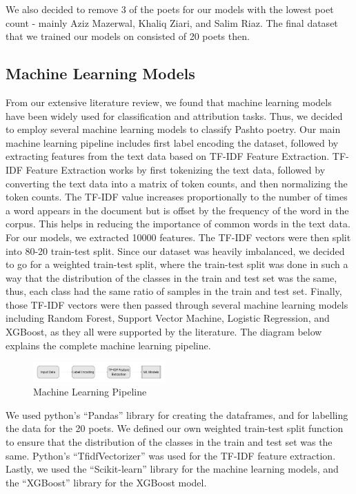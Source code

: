 We also decided to remove 3 of the poets for our models with the lowest poet count - mainly Aziz Mazerwal, Khaliq Ziari, and Salim Riaz. The final dataset that we trained our models on consisted of 20 poets then. 

\subsection{Machine Learning Models}
From our extensive literature review, we found that machine learning models have been widely used for classification and attribution tasks. Thus, we decided to employ several machine learning models to classify Pashto poetry. Our main machine learning pipeline includes first label encoding the dataset, followed by extracting features from the text data based on TF-IDF Feature Extraction. TF-IDF Feature Extraction works by first tokenizing the text data, followed by converting the text data into a matrix of token counts, and then normalizing the token counts. The TF-IDF value increases proportionally to the number of times a word appears in the document but is offset by the frequency of the word in the corpus. This helps in reducing the importance of common words in the text data. For our models, we extracted 10000 features. The TF-IDF vectors were then split into 80-20 train-test split. Since our dataset was heavily imbalanced, we decided to go for a weighted train-test split, where the train-test split was done in such a way that the distribution of the classes in the train and test set was the same, thus, each class had the same ratio of samples in the train and test set. Finally, those TF-IDF vectors were then passed through several machine learning models including Random Forest, Support Vector Machine, Logistic Regression, and XGBoost, as they all were supported by the literature. The diagram below explains the complete machine learning pipeline.

\begin{figure}[H]
    \centering
    \includegraphics[width=0.45\textwidth]{ml_pipe.png}
    \caption{Machine Learning Pipeline}
\end{figure}

We used python's ``Pandas'' library for creating the dataframes, and for labelling the data for the 20 poets. We defined our own weighted train-test split function to ensure that the distribution of the classes in the train and test set was the same. Python's ``TfidfVectorizer'' was used for the TF-IDF feature extraction. Lastly, we used the ``Scikit-learn'' library for the machine learning models, and the ``XGBoost'' library for the XGBoost model.

